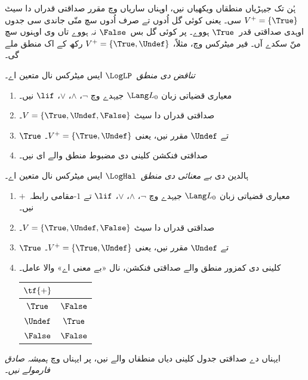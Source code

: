 \documentclass[../../../include/open-logic-section]{subfiles}
\begin{document}


ہُن تک جیہڑیاں منطقاں ویکھیاں نیں، اوہناں ساریاں وچ مقرر
صداقتی قدراں دا سیٹ $V^+ = \{\True\}$ سی۔ یعنی کوئی گل
اُدوں تے صرف اُدوں سچ منّی جاندی سی جدوں اوہدی صداقتی
قدر~$\True$ ہووے۔ پر کوئی گل بس~$\False$ نہ ہووے تاں وی
اوہنوں سچ منّ سکدے آں۔ فیر میٹرکس وچ، مثلاً، $V^+ = \{\True, \Undef\}$
رکھ کے اک منطق ملے گی۔

\begin{defn}
\emph{تناقض دی منطق}~$\LogLP$ ایس میٹرکس نال متعین اے۔
\begin{enumerate}
  \item معیاری قضیاتی زبان $\Lang L_0$ جیہدے وچ
  $\lnot$، $\land$، $\lor$، $\lif$ نیں۔
  \item صداقتی قدراں دا سیٹ $V = \{\True, \Undef, \False\}$۔
  \item $\True$ تے $\Undef$ مقرر نیں، یعنی $V^+ = \{\True, \Undef\}$۔
  \item صداقتی فنکشن کلینی دی مضبوط منطق والے ای نیں۔
\end{enumerate}
\end{defn}

\begin{defn}
ہالدین دی \emph{بے معنائی دی منطق}~$\LogHal$ ایس میٹرکس نال متعین اے۔
\begin{enumerate}
  \item معیاری قضیاتی زبان $\Lang L_0$ جیہدے وچ
  $\lnot$، $\land$، $\lor$، $\lif$ تے $1$-مقامی رابطہ~$+$ نیں۔
  \item صداقتی قدراں دا سیٹ $V = \{\True, \Undef, \False\}$۔
  \item $\True$ تے $\Undef$ مقرر نیں، یعنی $V^+ = \{\True, \Undef\}$۔
  \item کلینی دی کمزور منطق والے صداقتی فنکشن، نال «بے معنی اے» والا عامل۔
  \begin{center}
    \begin{tabular}{c|c} 
    $\tf{+}$ & \\ 
    \hline  
    $\True$ & $\False$ \\ 
    $\Undef$ & $\True$ \\
    $\False$ & $\False$ 
    \end{tabular}
  \end{center}
\end{enumerate}
\end{defn}

ایہناں دے صداقتی جدول کلینی دیاں منطقاں والے نیں، پر ایہناں
وچ \emph{ہمیشہ صادق فارمولے نیں}۔
\end{document}
